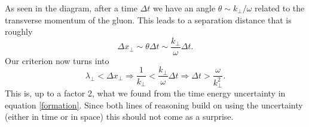 \documentclass[a4paper,12pt]{article}
\numberwithin{equation}{section}
\begin{document}
As seen in the diagram, after a time $\Delta t$ we have an angle $\theta\sim k_\perp/\omega$ related to the transverse momentum of the gluon. This leads to a separation distance that is roughly
\begin{equation}
\Delta x_\perp\sim \theta \Delta t \sim \frac{k_\perp}{\omega}\Delta t.
\end{equation}
Our criterion now turns into
\begin{equation}\label{formationk}
\lambda_\perp<\Delta x_\perp \Rightarrow \frac{1}{k_\perp}<\frac{k_\perp}{\omega}\Delta t \Rightarrow \Delta t > \frac{\omega}{k_\perp^2}.
\end{equation}
This is, up to a factor 2, what we found from the time energy uncertainty in equation \eqref{formation}. Since both lines of reasoning build on using the uncertainty (either in time or in space) this should not come as a surprise. 
\end{document}
